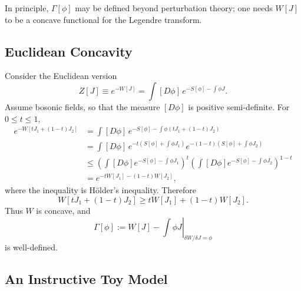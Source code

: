 In principle, \(\Gamma[\phi]\) may be defined beyond perturbation theory;
one needs \(W[J]\) to be a concave functional for the Legendre transform.

\subsection{Euclidean Concavity}

Consider the Euclidean version
\[
  Z[J]\equiv e^{-W[J]}
  =
  \int[D\phi]\,e^{-S[\phi]-\int\phi J}.
\]
Assume bosonic fields, so that the measure \([D\phi]\) is positive
semi-definite.  For \(0\le t\le1\),
\[
\begin{aligned}
  e^{-W[tJ_1+(1-t)J_2]}
  &=
  \int[D\phi]\,
  e^{-S[\phi]-\int\phi(tJ_1+(1-t)J_2)}
\\
  &=
  \int[D\phi]\,
  e^{-t(S[\phi]+\int\phi J_1)}
  e^{-(1-t)(S[\phi]+\int\phi J_2)}
\\
  &\le
  \left(\int[D\phi]e^{-S[\phi]-\int\phi J_1}\right)^t
  \left(\int[D\phi]e^{-S[\phi]-\int\phi J_2}\right)^{1-t}
\\
  &=
  e^{-tW[J_1]-(1-t)W[J_2]},
\end{aligned}
\]
where the inequality is Hölder's inequality.  Therefore
\[
  W[tJ_1+(1-t)J_2]
  \ge
  tW[J_1]+(1-t)W[J_2].
\]
Thus \(W\) is concave, and
\[
  \Gamma[\phi]
  :=
  \left.
  W[J]-\int\phi J
  \right|_{\delta W/\delta J=\phi}
\]
is well-defined.

\subsection{An Instructive Toy Model}

